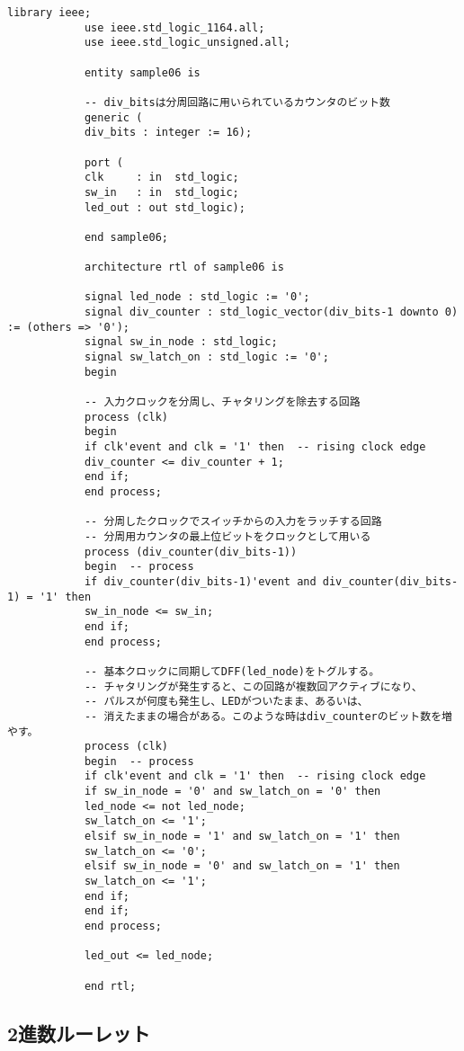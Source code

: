 \documentclass{ltjsarticle}
\begin{document}
		\begin{lstlisting}[caption=sample6, label=sample6]
			library ieee;
			use ieee.std_logic_1164.all;
			use ieee.std_logic_unsigned.all;

			entity sample06 is

			-- div_bitsは分周回路に用いられているカウンタのビット数
			generic (
			div_bits : integer := 16);

			port (
			clk     : in  std_logic;
			sw_in   : in  std_logic;
			led_out : out std_logic);

			end sample06;

			architecture rtl of sample06 is

			signal led_node : std_logic := '0';
			signal div_counter : std_logic_vector(div_bits-1 downto 0) := (others => '0');
			signal sw_in_node : std_logic;
			signal sw_latch_on : std_logic := '0';
			begin

			-- 入力クロックを分周し、チャタリングを除去する回路
			process (clk)
			begin
			if clk'event and clk = '1' then  -- rising clock edge
			div_counter <= div_counter + 1;
			end if;
			end process;

			-- 分周したクロックでスイッチからの入力をラッチする回路
			-- 分周用カウンタの最上位ビットをクロックとして用いる
			process (div_counter(div_bits-1))
			begin  -- process
			if div_counter(div_bits-1)'event and div_counter(div_bits-1) = '1' then
			sw_in_node <= sw_in;
			end if;
			end process;

			-- 基本クロックに同期してDFF(led_node)をトグルする。
			-- チャタリングが発生すると、この回路が複数回アクティブになり、
			-- パルスが何度も発生し、LEDがついたまま、あるいは、
			-- 消えたままの場合がある。このような時はdiv_counterのビット数を増やす。
			process (clk)
			begin  -- process
			if clk'event and clk = '1' then  -- rising clock edge
			if sw_in_node = '0' and sw_latch_on = '0' then
			led_node <= not led_node;
			sw_latch_on <= '1';
			elsif sw_in_node = '1' and sw_latch_on = '1' then
			sw_latch_on <= '0';
			elsif sw_in_node = '0' and sw_latch_on = '1' then
			sw_latch_on <= '1';
			end if;
			end if;
			end process;

			led_out <= led_node;

			end rtl;
		\end{lstlisting}

	\subsection{2進数ルーレット}
\end{document}
